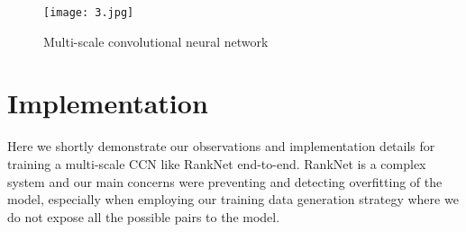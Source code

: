 \documentclass[10pt,twocolumn,letterpaper]{article}
\begin{document}
\begin{figure}[htp]
\centering
\texttt{[image: 3.jpg]}
\caption{Multi-scale convolutional neural network}
\label{fig:captioning}
\end{figure}

\vspace{-2mm}
\section{Implementation}\vspace{-1mm}

Here we shortly demonstrate our observations and implementation details for training a multi-scale CCN like RankNet end-to-end. RankNet is a complex system and our main concerns were preventing and detecting overfitting of the model, especially when employing our training data generation strategy where we do not expose all the possible pairs to the model.
\vspace{-1mm}
\end{document}
